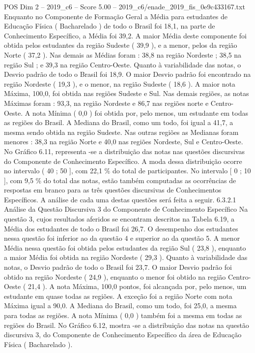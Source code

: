 \begin{textsample}{POS Dim 2 – 2019\_c6 – Score 5.00 – 2019\_c6/enade\_2019\_fis\_0e9c433167.txt}
Enquanto no Componente de Formação Geral a Média para estudantes de Educação Física ( Bacharelado ) de todo o Brasil foi 18,1, na parte de Conhecimento Específico, a Média foi 39,2.
A maior Média deste componente foi obtida pelos estudantes da região Sudeste ( 39,9 ), e a menor, pelos da região Norte ( 37,2 ).
Nas demais as Médias foram : 38,8 na região Nordeste ; 38,5 na região Sul ; e 39,3 na região Centro-Oeste.
Quanto à variabilidade das notas, o Desvio padrão de todo o Brasil foi 18,9.
O maior Desvio padrão foi encontrado na região Nordeste ( 19,3 ), e o menor, na região Sudeste ( 18,6 ).
A maior nota Máxima, 100,0, foi obtida nas regiões Sudeste e Sul.
Nas demais regiões, as notas Máximas foram : 93,3, na região Nordeste e 86,7 nas regiões norte e Centro-Oeste.
A nota Mínima ( 0,0 ) foi obtida por, pelo menos, um estudante em todas as regiões do Brasil.
A Mediana do Brasil, como um todo, foi igual a 41,7, a mesma sendo obtida na região Sudeste.
Nas outras regiões as Medianas foram menores : 38,3 na região Norte e 40,0 nas regiões Nordeste, Sul e Centro-Oeste.
No Gráfico 6.11, representa -se a distribuição das notas nas questões discursivas do Componente de Conhecimento Específico.
A moda dessa distribuição ocorre no intervalo ( 40 ; 50 ], com 22,1 \% do total de participantes.
No intervalo [ 0 ; 10 ], com 9,5 \% do total das notas, estão também computadas as ocorrências de respostas em branco para as três questões discursivas de Conhecimentos Específicos.
A análise de cada uma destas questões será feita a seguir. 6.3.2.1 Análise da Questão Discursiva 3 do Componente de Conhecimento Específico Na questão 3, cujos resultados aferidos se encontram descritos na Tabela 6.19, a Média dos estudantes de todo o Brasil foi 26,7.
O desempenho dos estudantes nessa questão foi inferior ao da questão 4 e superior ao da questão 5.
A menor Média nessa questão foi obtida pelos estudantes da região Sul ( 23,8 ), enquanto a maior Média foi obtida na região Nordeste ( 29,3 ).
Quanto à variabilidade das notas, o Desvio padrão de todo o Brasil foi 23,7.
O maior Desvio padrão foi obtido na região Nordeste ( 24,9 ), enquanto o menor foi obtido na região Centro-Oeste ( 21,4 ).
A nota Máxima, 100,0 pontos, foi alcançada por, pelo menos, um estudante em quase todas as regiões.
A exceção foi a região Norte com nota Máxima igual a 90,0.
A Mediana do Brasil, como um todo, foi 25,0, a mesma para todas as regiões.
A nota Mínima ( 0,0 ) também foi a mesma em todas as regiões do Brasil.
No Gráfico 6.12, mostra -se a distribuição das notas na questão discursiva 3, do Componente de Conhecimento Específico da área de Educação Física ( Bacharelado ).

\end{textsample}
